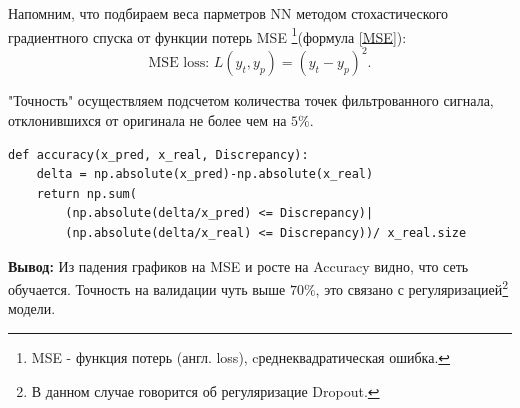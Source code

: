 \documentclass[a4paper,11pt]{article} %
\begin{document}
Напомним, что подбираем веса парметров NN методом стохастического градиентного спуска от функции потерь MSE \footnote{MSE - функция потерь (англ. loss), cреднеквадратическая ошибка.}(формула \ref{MSE}):
$$\text{MSE loss: } L(y_t,y_p)=(y_t-y_p)^2.$$

"Точность" осуществляем подсчетом количества точек фильтрованного сигнала, отклонившихся  от оригинала не  более чем на $5\%$.

\begin{lstlisting}
def accuracy(x_pred, x_real, Discrepancy):
    delta = np.absolute(x_pred)-np.absolute(x_real)
    return np.sum(
        (np.absolute(delta/x_pred) <= Discrepancy)|
        (np.absolute(delta/x_real) <= Discrepancy))/ x_real.size
\end{lstlisting}

\textbf{Вывод:} Из падения графиков на MSE и росте на Accuracy видно,  что сеть обучается. Точность на валидации чуть выше $70\%$, это связано с регуляризацией\footnote{В данном случае говорится об  регуляризацие Dropout.} модели.
\end{document}
